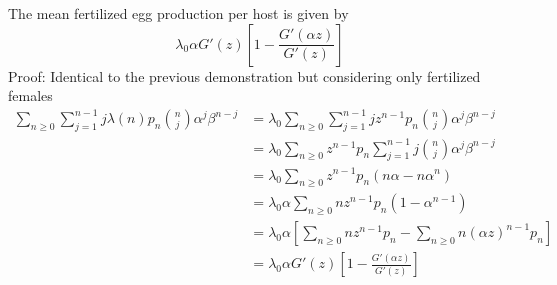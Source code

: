 \documentclass[bimj,fleqn]{w-art}
\theoremstyle{plain}
\theoremstyle{definition}
\begin{document}
The mean fertilized egg production per host is given by
\begin{equation}\label{prodhuevosfecun}
\lambda_0\alpha G'(z)\left[1-\frac{G'(\alpha z)}{G'(z)} \right]
\end{equation}
Proof: Identical to the previous demonstration but considering only fertilized females
\begin{equation*}
\begin{split}
\sum_{n\geq 0}\sum_{j=1}^{n-1}j\lambda(n)p_n\binom{n}{j}\alpha^j\beta^{n-j}
&=\lambda_0\sum_{n\geq 0}\sum_{j=1}^{n-1}jz^{n-1}p_n\binom{n}{j}\alpha^j\beta^{n-j}\\
&=\lambda_0\sum_{n\geq 0}z^{n-1}p_n\sum_{j=1}^{n-1} j\binom{n}{j}\alpha^j\beta^{n-j}\\
&=\lambda_0\sum_{n\geq 0}z^{n-1}p_n(n\alpha-n\alpha^n)\\
&=\lambda_0\alpha\sum_{n\geq 0}nz^{n-1}p_n(1-\alpha^{n-1})\\
&=\lambda_0\alpha \left[ \sum_{n\geq 0}nz^{n-1}p_n-\sum_{n\geq 0}n(\alpha z)^{n-1}p_n\right] \\
&=\lambda_0\alpha G'(z)\left[1-\frac{G'(\alpha z)}{G'(z)} \right] 
\end{split}
\end{equation*}
\end{document}
